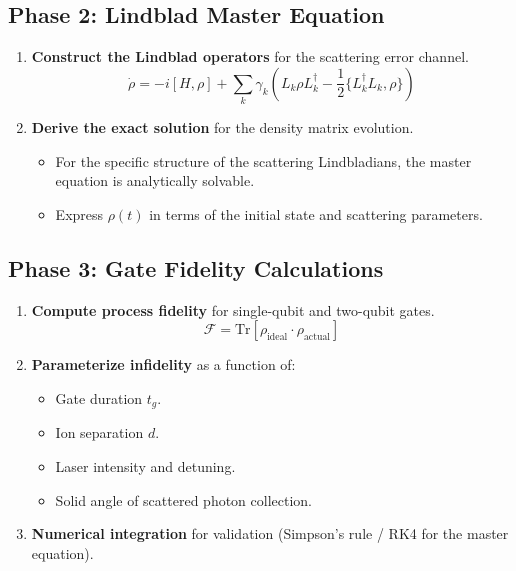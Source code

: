 \documentclass[11pt,a4paper]{article}
\begin{document}
\subsection{Phase 2: Lindblad Master Equation}
\begin{enumerate}[label=\textbf{2.\arabic*}]
  \item \textbf{Construct the Lindblad operators} for the scattering error channel.
    \begin{equation*}
      \dot{\rho} = -i[H, \rho] + \sum_k \gamma_k \left(L_k \rho L_k^\dagger - \frac{1}{2}\{L_k^\dagger L_k, \rho\}\right)
    \end{equation*}
  \item \textbf{Derive the exact solution} for the density matrix evolution.
    \begin{itemize}
      \item For the specific structure of the scattering Lindbladians, the master equation is analytically solvable.
      \item Express $\rho(t)$ in terms of the initial state and scattering parameters.
    \end{itemize}
\end{enumerate}

\subsection{Phase 3: Gate Fidelity Calculations}
\begin{enumerate}[label=\textbf{3.\arabic*}]
  \item \textbf{Compute process fidelity} for single-qubit and two-qubit gates.
    \begin{equation*}
      \mathcal{F} = \text{Tr}[\rho_{\text{ideal}} \cdot \rho_{\text{actual}}]
    \end{equation*}
  \item \textbf{Parameterize infidelity} as a function of:
    \begin{itemize}
      \item Gate duration $t_g$.
      \item Ion separation $d$.
      \item Laser intensity and detuning.
      \item Solid angle of scattered photon collection.
    \end{itemize}
  \item \textbf{Numerical integration} for validation (Simpson's rule / RK4 for the master equation).
\end{enumerate}
\end{document}
